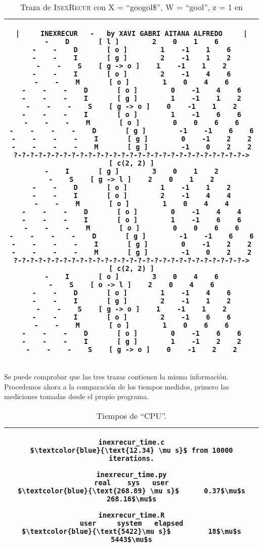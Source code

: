 \documentclass{article}
\newcommand{\tempcaption}{}
\newenvironment{code}[4]{
\begin{table}[h!]
\gdef\tempcaption{Traza de \textsc{InexRecur} con X = ``#1'', W = ``#2'', z = #3 en #4}
\centering
\begin{tabular}{|c|}
\hline }
{\\\hline
\end{tabular}
\caption{\protect\tempcaption}
\end{table} }
\newenvironment{codesnip}[1]{
\begin{table}[h!]
\gdef\tempcaption{#1}
\centering
\begin{tabular}{|c|}
\hline}
{\\\hline
\end{tabular}
\caption{\tempcaption}
\end{table}}
\newcommand{\R}{%
\raisebox{-.06\height}{\texttt{[image: ../gallery/R.pdf]}{\hspace{1ex}}}}
\begin{document}
\vfill
\begin{code}{googol\$}{gool}{1}{\R}
\begin{lstlisting}
|     INEXRECUR   -   by XAVI GABRI AITANA ALFREDO     |
-    D       [ l ]        2    0    1    6
-    -    D       [ o ]        1    -1    1    6
-    -    I       [ g ]        2    -1    1    2
-    -    S    [ g -> o ]    1    -1    1    2
-    -    I       [ o ]        2    -1    4    6
-    -    M       [ o ]        1    0    4    6
-    -    -    D       [ o ]        0    -1    4    6
-    -    -    I       [ g ]        1    -1    1    2
-    -    -    S    [ g -> o ]    0    -1    1    2
-    -    -    I       [ o ]        1    -1    6    6
-    -    -    M       [ o ]        0    0    6    6
-    -    -    -    D       [ g ]        -1    -1    6    6
-    -    -    -    I       [ g ]        0    -1    2    2
-    -    -    -    M       [ g ]        -1    0    2    2
?-?-?-?-?-?-?-?-?-?-?-?-?-?-?-?-?-?-?-?-?-?-?-?-?-?-?-?->  [ c(2, 2) ]
-    I       [ g ]        3    0    1    2
-    S    [ g -> l ]    2    0    1    2
-    -    D       [ o ]        1    -1    1    2
-    -    I       [ o ]        2    -1    4    4
-    -    M       [ o ]        1    0    4    4
-    -    -    D       [ o ]        0    -1    4    4
-    -    -    I       [ o ]        1    -1    6    6
-    -    -    M       [ o ]        0    0    6    6
-    -    -    -    D       [ g ]        -1    -1    6    6
-    -    -    -    I       [ g ]        0    -1    2    2
-    -    -    -    M       [ g ]        -1    0    2    2
?-?-?-?-?-?-?-?-?-?-?-?-?-?-?-?-?-?-?-?-?-?-?-?-?-?-?-?->  [ c(2, 2) ]
-    I       [ o ]        3    0    4    6
-    S    [ o -> l ]    2    0    4    6
-    -    D       [ o ]        1    -1    4    6
-    -    I       [ g ]        2    -1    1    2
-    -    S    [ g -> o ]    1    -1    1    2
-    -    I       [ o ]        2    -1    6    6
-    -    M       [ o ]        1    0    6    6
-    -    -    D       [ o ]        0    -1    6    6
-    -    -    I       [ g ]        1    -1    2    2
-    -    -    S    [ g -> o ]    0    -1    2    2
\end{lstlisting}
\end{code}
\vfill

\clearpage

Se puede comprobar que las tres trazas contienen la misma información.
Procedemos ahora a la comparación de los tiempos medidos, primero las
mediciones tomadas desde el propio programa.
\begin{codesnip}{Tiempos de ``CPU''.}
\begin{lstlisting}
inexrecur_time.c
$\textcolor{blue}{\text{12.34} \mu s}$ from 10000 iterations.

inexrecur_time.py
real    sys   user
$\textcolor{blue}{\text{268.89} \mu s}$      0.37$\mu$s 268.16$\mu$s

inexrecur_time.R
user     system   elapsed
$\textcolor{blue}{\text{5422}\mu s}$         18$\mu$s      5443$\mu$s
\end{lstlisting}
\end{codesnip}
\end{document}
